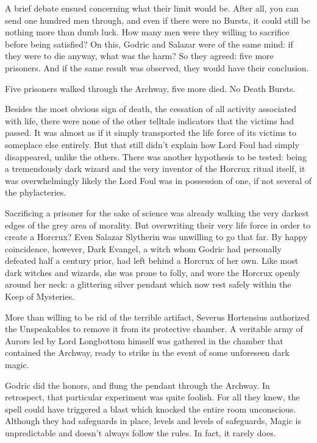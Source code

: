 A brief debate ensued concerning what their limit would be. After all, you can send one hundred men through, and even if there were no Bursts, it could still be nothing more than dumb luck. How many men were they willing to sacrifice before being satisfied? On this, Godric and Salazar were of the same mind: if they were to die anyway, what was the harm? So they agreed: five more prisoners. And if the same result was observed, they would have their conclusion.

Five prisoners walked through the Archway, five more died. No Death Bursts.

Besides the most obvious sign of death, the cessation of all activity associated with life, there were none of the other telltale indicators that the victims had passed. It was almost as if it simply transported the life force of its victims to someplace else entirely. But that still didn’t explain how Lord Foul had simply disappeared, unlike the others. There was another hypothesis to be tested: being a tremendously dark wizard and the very inventor of the Horcrux ritual itself, it was overwhelmingly likely the Lord Foul was in possession of one, if not several of the phylacteries.

Sacrificing a prisoner for the sake of science was already walking the very darkest edges of the grey area of morality. But overwriting their very life force in order to create a Horcrux? Even Salazar Slytherin was unwilling to go that far. By happy coincidence, however, Dark Evangel, a witch whom Godric had personally defeated half a century prior, had left behind a Horcrux of her own. Like most dark witches and wizards, she was prone to folly, and wore the Horcrux openly around her neck: a glittering silver pendant which now rest safely within the Keep of Mysteries.

More than willing to be rid of the terrible artifact, Severus Hortensius authorized the Unspeakables to remove it from its protective chamber. A veritable army of Aurors led by Lord Longbottom himself was gathered in the chamber that contained the Archway, ready to strike in the event of some unforeseen dark magic.

Godric did the honors, and flung the pendant through the Archway. In retrospect, that particular experiment was quite foolish. For all they knew, the spell could have triggered a blast which knocked the entire room unconscious. Although they had safeguards in place, levels and levels of safeguards, Magic is unpredictable and doesn’t always follow the rules. In fact, it rarely does.

